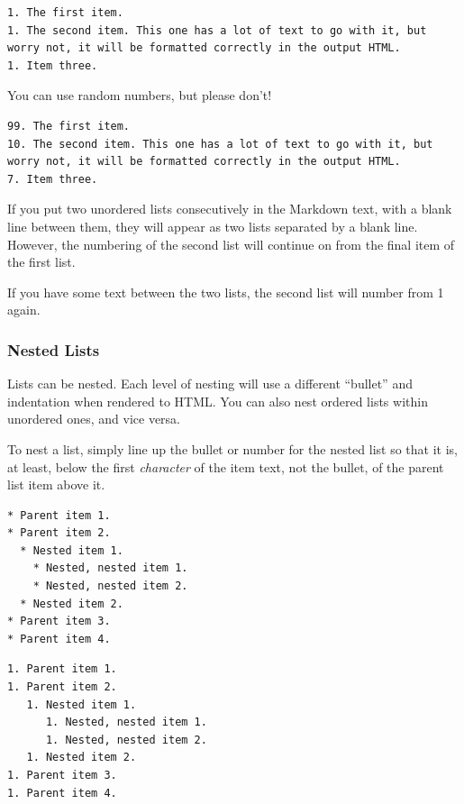 \begin{lstlisting}[caption={Ordered lists.},style=myText]
1. The first item.
1. The second item. This one has a lot of text to go with it, but worry not, it will be formatted correctly in the output HTML.
1. Item three.
\end{lstlisting}

You can use random numbers, but please don't!

\begin{lstlisting}[caption={Ordered lists.},style=myText]
99. The first item.
10. The second item. This one has a lot of text to go with it, but worry not, it will be formatted correctly in the output HTML.
7. Item three.
\end{lstlisting}


If you put two unordered lists consecutively in the Markdown text, with a blank line between them, they will appear as two lists separated by a blank line. However, the numbering of the second list will continue on from the final item of the first list.

If you have some text between the two lists, the second list will number from 1 again.

\subsubsection{Nested Lists}\label{sect: Nested Lists}

Lists can be nested. Each level of nesting will use a different ``bullet'' and indentation when rendered to HTML. You can also nest ordered lists within unordered ones, and vice versa.

To nest a list, simply line up the bullet or number for the nested list so that it is, at least, below the first \emph{character} of the item text, not the bullet, of the parent list item above it.

\begin{lstlisting}[caption={Nested unordered lists.},style=myText]
* Parent item 1.
* Parent item 2.
  * Nested item 1.
    * Nested, nested item 1.
    * Nested, nested item 2.
  * Nested item 2.
* Parent item 3.
* Parent item 4.
\end{lstlisting}

\begin{lstlisting}[caption={Nested ordered lists.},style=myText]
1. Parent item 1.
1. Parent item 2.
   1. Nested item 1.
      1. Nested, nested item 1.
      1. Nested, nested item 2.
   1. Nested item 2.
1. Parent item 3.
1. Parent item 4.
\end{lstlisting}

